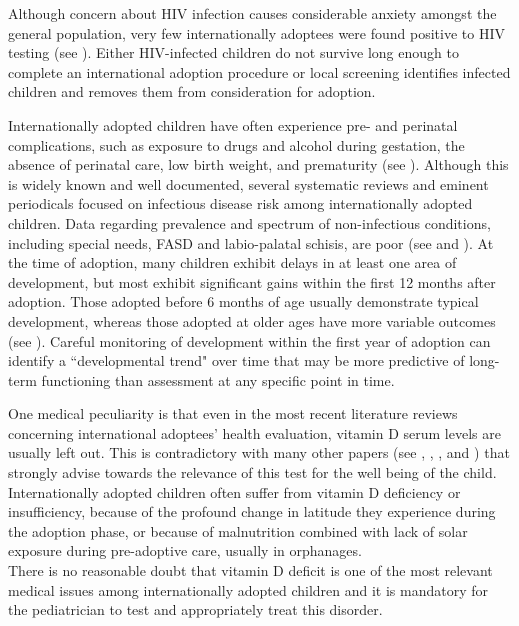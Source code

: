 Although concern about HIV infection causes considerable anxiety amongst the general population, very few internationally adoptees  were found positive to HIV testing (see \cite{caringfor}). Either HIV-infected children do not survive long enough to complete an international adoption procedure or local screening identifies infected children and removes them from consideration for adoption.

Internationally adopted children have often experience pre- and perinatal complications, such as exposure to drugs and alcohol during gestation, the absence of perinatal care, low birth weight, and prematurity (see \cite{preventing}). Although this is widely known and well documented, several systematic reviews and eminent periodicals focused on infectious disease risk among internationally adopted children. Data regarding prevalence and spectrum of non-infectious conditions, including special needs, FASD and labio-palatal schisis, are poor (see \cite{notonlyinfectious} and \cite{nonsoloinfezioni}). At the time of adoption, many children exhibit delays in at least one area of development, but most exhibit significant gains within the first 12 months after adoption. Those adopted before 6 months of age usually demonstrate typical development, whereas those adopted at older ages have more variable outcomes (see \cite{nelson}). Careful monitoring of development within the first year of adoption can identify a ``developmental trend" over time that may be more predictive of long-term functioning than assessment at any specific point in time. 

One medical peculiarity is that even in the most recent literature reviews concerning international adoptees' health evaluation, vitamin D serum levels are usually left out. This is contradictory with many other papers (see \cite{vitDadopt1}, \cite{vitDadopt2}, \cite{vitDadopt3}, and \cite{vitDadopt4}) that strongly advise towards the relevance of this test for the well being of the child. Internationally adopted children often suffer from vitamin D deficiency or insufficiency, because of the profound change in latitude they experience during the adoption phase, or because of malnutrition combined with lack of solar exposure during pre-adoptive care, usually in orphanages.\\
There is no reasonable doubt that vitamin D deficit is one of the most relevant medical issues among internationally adopted children and it is mandatory for the pediatrician to test and appropriately treat this disorder.

